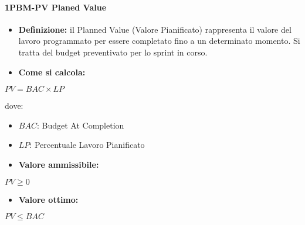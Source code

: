 \paragraph*{1PBM-PV Planed Value}
\begin{itemize}
    \item \textbf{Definizione:} il Planned Value (Valore Pianificato) rappresenta il valore del lavoro programmato per essere completato fino a un determinato momento. Si tratta del budget preventivato per lo sprint in corso.
    \item \textbf{Come si calcola:}
\end{itemize}
\begin{center}
   $PV = BAC \times LP$ 
\end{center}
dove:
\begin{itemize}[label=$\rightarrow$]
    \item $BAC$: Budget At Completion
    \item $LP$: Percentuale Lavoro Pianificato
\end{itemize}
\begin{itemize}
    \item \textbf{Valore ammissibile:}
\end{itemize}
\begin{center}
    $PV \geq 0$
\end{center}
\begin{itemize}
    \item \textbf{Valore ottimo:}
\end{itemize}
\begin{center}
    $PV \leq BAC$
\end{center}

